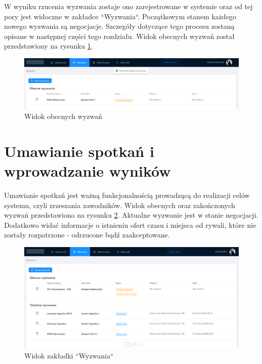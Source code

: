 W wyniku rzucenia wyzwania zostaje ono zarejestrowane w systemie oraz od tej pory jest widoczne w zakładce ``Wyzwania``. Początkowym stanem każdego nowego wyzwania są negocjacje. Szczegóły dotyczące tego procesu zostaną opisane w następnej części tego rozdziału. Widok obecnych wyzwań został przedstawiony na rysunku \ref{fig:ss-search-8}.

\begin{figure}[H]
\centering
\includegraphics[width=\linewidth]{065-dzialanie/rys/ss-search-8.png}
\caption{Widok obecnych wyzwań}
\label{fig:ss-search-8}
\end{figure}


\section{Umawianie spotkań i wprowadzanie wyników}

Umawianie spotkań jest ważną funkcjonalnością prowadzącą do realizacji celów systemu, czyli zrzeszania zawodników. Widok obecnych oraz zakończonych wyzwań przedstawiono na rysunku \ref{fig:ss--match-0}. Aktualne wyzwanie jest w stanie negocjacji. Dodatkowo widać informacje o istnieniu ofert czasu i miejsca od rywali, które nie zostały rozpatrzone - odrzucone bądź zaakceptowane.

\begin{figure}[H]
\centering
\includegraphics[width=\linewidth]{065-dzialanie/rys/ss-match-0.PNG}
\caption{Widok zakładki ``Wyzwania``}
\label{fig:ss--match-0}
\end{figure}

